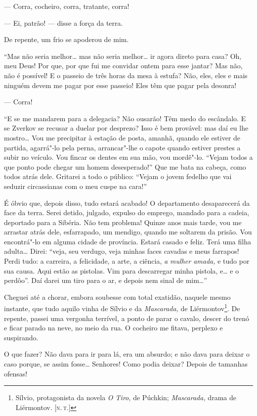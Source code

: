 --- Corra, cocheiro, corra, tratante, corra!

--- Ei, patrão! --- disse a força da terra.

De repente, um frio se apoderou de mim.

``Mas não seria melhor\ldots{} mas não seria melhor\ldots{} ir agora direto para
casa? Oh, meu Deus! Por que, por que fui me convidar ontem para esse
jantar? Mas não, não é possível! E o passeio de três horas da mesa à
estufa? Não, eles, eles e mais ninguém devem me pagar por esse passeio!
Eles têm que pagar pela desonra!

--- Corra!

``E se me mandarem para a delegacia? Não ousarão! Têm medo do escândalo.
E se Zverkov se recusar a duelar por desprezo? Isso é bem provável: mas
daí eu lhe mostro\ldots{} Vou me precipitar à estação de posta, amanhã,
quando ele estiver de partida, agarrá"-lo pela perna, arrancar"-lhe o
capote quando estiver prestes a subir no veículo. Vou fincar os dentes
em sua mão, vou mordê"-lo. ``Vejam todos a que ponto pode chegar um homem
desesperado!'' Que me bata na cabeça, como todos atrás dele. Gritarei a
todo o público: ``Vejam o jovem fedelho que vai seduzir circassianas com
o meu cuspe na cara!''

É óbvio que, depois disso, tudo estará acabado! O departamento
desaparecerá da face da terra. Serei detido, julgado, expulso do
emprego, mandado para a cadeia, deportado para a Sibéria. Não tem
problema! Quinze anos mais tarde, vou me arrastar atrás dele,
esfarrapado, um mendigo, quando me soltarem da prisão. Vou encontrá"-lo
em alguma cidade de província. Estará casado e feliz. Terá uma filha
adulta\ldots{} Direi: ``veja, seu verdugo, veja minhas faces cavadas e meus
farrapos! Perdi tudo: a carreira, a felicidade, a arte, a ciência,
\emph{a mulher amada,} e tudo por sua causa. Aqui estão as pistolas. Vim
para descarregar minha pistola, e\ldots{} e o perdôo''. Daí darei um tiro
para o ar, e depois nem sinal de mim\ldots{}''

Cheguei até a chorar, embora soubesse com total exatidão, naquele mesmo
instante, que tudo aquilo vinha de Sílvio e da \emph{Mascarada,} de
Liérmontov\footnote{Sílvio, protagonista da novela \emph{O Tiro,} de
  Púchkin; \emph{Mascarada,} drama de Liérmontov. {[}\textsc{n.\,t.}{]}}. De
repente, passei uma vergonha terrível, a ponto de parar o cavalo, descer
do trenó e ficar parado na neve, no meio da rua. O cocheiro me fitava,
perplexo e suspirando.

O que fazer? Não dava para ir para lá, era um absurdo; e não dava para
deixar o caso porque, se assim fosse\ldots{} Senhores! Como podia deixar?
Depois de tamanhas ofensas!

